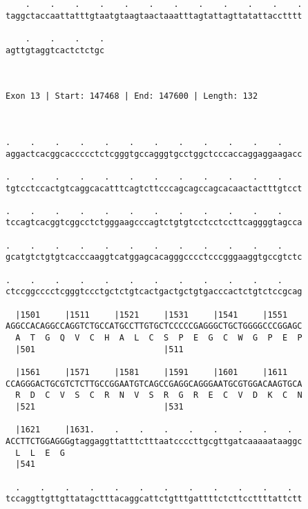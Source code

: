 \documentclass{article}
\begin{document}
\begin{Verbatim}
    .    .    .    .    .    .    .    .    .    .    .    .
taggctaccaattatttgtaatgtaagtaactaaatttagtattagttatattacctttt
                                                            
    .    .    .    .
agttgtaggtcactctctgc
                    
                    
 
Exon 13 | Start: 147468 | End: 147600 | Length: 132



.    .    .    .    .    .    .    .    .    .    .    .    
aggactcacggcaccccctctcgggtgccagggtgcctggctcccaccaggaggaagacc
                                                            
.    .    .    .    .    .    .    .    .    .    .    .    
tgtcctccactgtcaggcacatttcagtcttcccagcagccagcacaactactttgtcct
                                                            
.    .    .    .    .    .    .    .    .    .    .    .    
tccagtcacggtcggcctctgggaagcccagtctgtgtcctcctccttcaggggtagcca
                                                            
.    .    .    .    .    .    .    .    .    .    .    .    
gcatgtctgtgtcacccaaggtcatggagcacagggcccctcccgggaaggtgccgtctc
                                                            
.    .    .    .    .    .    .    .    .    .    .    .    
ctccggcccctcgggtccctgctctgtcactgactgctgtgacccactctgtctccgcag
                                                            
  |1501     |1511     |1521     |1531     |1541     |1551   
AGGCCACAGGCCAGGTCTGCCATGCCTTGTGCTCCCCCGAGGGCTGCTGGGGCCCGGAGC
  A  T  G  Q  V  C  H  A  L  C  S  P  E  G  C  W  G  P  E  P
  |501                          |511                        
  
  |1561     |1571     |1581     |1591     |1601     |1611   
CCAGGGACTGCGTCTCTTGCCGGAATGTCAGCCGAGGCAGGGAATGCGTGGACAAGTGCA
  R  D  C  V  S  C  R  N  V  S  R  G  R  E  C  V  D  K  C  N
  |521                          |531                        
  
  |1621     |1631.    .    .    .    .    .    .    .    .  
ACCTTCTGGAGGGgtaggaggttatttctttaatccccttgcgttgatcaaaaataaggc
  L  L  E  G                                                
  |541                                                      
  
  .    .    .    .    .    .    .    .    .    .    .    .  
tccaggttgttgttatagctttacaggcattctgtttgattttctcttccttttattctt
                                                            

\end{Verbatim}
\end{document}
